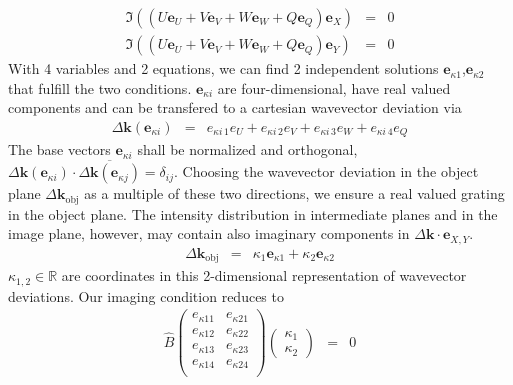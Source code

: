 \documentclass[12pt,a4paper,twoside,openright,BCOR10mm,headsepline,titlepage,abstracton,chapterprefix,final]{scrreprt}
\newcommand\Vector[1]{{\mathbf{#1}}}
\newcommand\wavenumber{k}
\newcommand\Wavevector{\Vector{\wavenumber}}
\newcommand\obj{\textrm{obj}}
\begin{document}
\begin{subequations}
\begin{eqnarray}
 \Im \left( ( U \Vector{e}_U + V \Vector{e}_V + W \Vector{e}_W + Q \Vector{e}_Q ) \Vector{e}_X \right) &=& 0 \\
 \Im \left( ( U \Vector{e}_U + V \Vector{e}_V + W \Vector{e}_W + Q \Vector{e}_Q ) \Vector{e}_Y \right) &=& 0 
\end{eqnarray}
\label{eq:restriction_to_2d_kspace} 
\end{subequations}
With 4 variables and 2 equations, we can find 2 independent solutions $\Vector{e}_{\kappa1}$,$\Vector{e}_{\kappa2}$ that fulfill the two conditions.
$\Vector{e}_{\kappa i}$ are four-dimensional, have real valued components and can be transfered to a cartesian wavevector deviation via
\begin{eqnarray}
 \Delta \Wavevector(\Vector{e}_{\kappa i}) &=& e_{\kappa i\,1} e_{U} + e_{\kappa i\,2} e_{V} + e_{\kappa i\,3} e_{W} + e_{\kappa i\,4} e_{Q}
\end{eqnarray}
The base vectors $\Vector{e}_{\kappa i}$ shall be normalized and orthogonal, 
$\Delta \Wavevector(\Vector{e}_{\kappa i}) \cdot \overline{\Delta \Wavevector (\Vector{e}_{\kappa j})} = \delta_{ij}$.
Choosing the wavevector deviation in the object plane $\Delta \Wavevector_\obj$ as a multiple of these two directions,
we ensure a real valued grating in the object plane. 
The intensity distribution in intermediate planes and in the image plane, however, 
may contain also imaginary components in $\Delta \Wavevector \cdot \Vector{e}_{X,Y}$.
\begin{eqnarray}
 \Delta \Wavevector_\obj &=& \kappa_1 \Vector{e}_{\kappa1} + \kappa_2 \Vector{e}_{\kappa2} \label{eq:deltaK_as_kappa}
\end{eqnarray}
$\kappa_{1,2} \in \mathbb{R}$ are coordinates in this 2-dimensional representation of wavevector deviations.
Our imaging condition reduces to
\begin{eqnarray}
 \hat{B}
 \begin{pmatrix}
 e_{\kappa11} & e_{\kappa21} \\
 e_{\kappa12} & e_{\kappa22} \\
 e_{\kappa13} & e_{\kappa23} \\
 e_{\kappa14} & e_{\kappa24} \\ 
 \end{pmatrix}
 \begin{pmatrix}
 \kappa_1 \\ \kappa_2 
 \end{pmatrix}
 &=& 0
\end{eqnarray}
\end{document}
